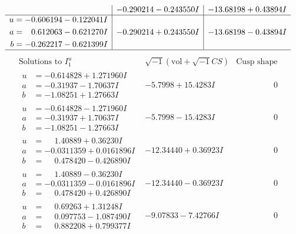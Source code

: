 \documentclass[1p]{elsarticle_modified}
\theoremstyle{definition}
\newcommand{\I}{\sqrt{-1}}
\begin{document}
$$\begin{array}{c|c|c}
 & -0.290214 - 0.243550 I & -13.68198 + 0.43894 I \\ \hline\begin{aligned}
u &= -0.606194 - 0.122041 I \\
a &= \phantom{-}0.612063 - 0.621270 I \\
b &= -0.262217 - 0.621399 I\end{aligned}
 & -0.290214 + 0.243550 I & -13.68198 - 0.43894 I\\
 \hline 
 \end{array}$$\newpage$$\begin{array}{c|c|c}  
\text{Solutions to }I^u_{1}& \I (\text{vol} + \sqrt{-1}CS) & \text{Cusp shape}\\
 \hline 
\begin{aligned}
u &= -0.614828 + 1.271960 I \\
a &= -0.31937 - 1.70637 I \\
b &= -1.08251 + 1.27663 I\end{aligned}
 & -5.7998 + 15.4283 I & \phantom{-0.000000 } 0 \\ \hline\begin{aligned}
u &= -0.614828 - 1.271960 I \\
a &= -0.31937 + 1.70637 I \\
b &= -1.08251 - 1.27663 I\end{aligned}
 & -5.7998 - 15.4283 I & \phantom{-0.000000 } 0 \\ \hline\begin{aligned}
u &= \phantom{-}1.40889 + 0.36230 I \\
a &= -0.0311359 + 0.0161896 I \\
b &= \phantom{-}0.478420 - 0.426890 I\end{aligned}
 & -12.34440 + 0.36923 I & \phantom{-0.000000 } 0 \\ \hline\begin{aligned}
u &= \phantom{-}1.40889 - 0.36230 I \\
a &= -0.0311359 - 0.0161896 I \\
b &= \phantom{-}0.478420 + 0.426890 I\end{aligned}
 & -12.34440 - 0.36923 I & \phantom{-0.000000 } 0 \\ \hline\begin{aligned}
u &= \phantom{-}0.69263 + 1.31248 I \\
a &= \phantom{-}0.097753 - 1.087490 I \\
b &= \phantom{-}0.882208 + 0.799377 I\end{aligned}
 & -9.07833 - 7.42766 I & \phantom{-0.000000 } 0 \\ \hline\begin{aligned}

\end{aligned}
\end{array}$$
\end{document}
